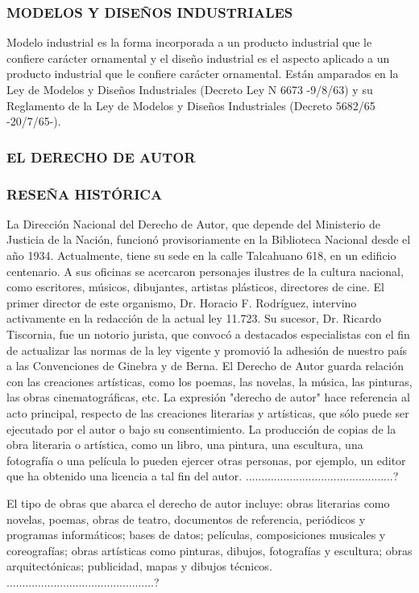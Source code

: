\subsubsection*{MODELOS Y DISEÑOS INDUSTRIALES}
Modelo industrial es la forma incorporada a un producto industrial que le confiere carácter ornamental y el diseño industrial es el aspecto aplicado a un producto industrial que le confiere carácter ornamental. Están amparados en la Ley de Modelos y Diseños Industriales (Decreto Ley N 6673 -9/8/63) y su Reglamento de la Ley de Modelos y Diseños Industriales (Decreto 5682/65 -20/7/65-).

\subsubsection*{EL DERECHO DE AUTOR}
\subsubsection*{RESEÑA HISTÓRICA}
La Dirección Nacional del Derecho de Autor, que depende del Ministerio de Justicia de la Nación, funcionó provisoriamente en la Biblioteca Nacional desde el año 1934. Actualmente, tiene su sede en la calle Talcahuano 618, en un edificio centenario. A sus oficinas se acercaron personajes ilustres de la cultura nacional, como escritores, músicos, dibujantes, artistas plásticos, directores de cine. El primer director de este organismo, Dr. Horacio F. Rodríguez, intervino activamente en la redacción de la actual ley 11.723. Su sucesor, Dr. Ricardo Tiscornia, fue un notorio jurista, que convocó a destacados especialistas con el fin de actualizar las normas de la ley vigente y promovió la adhesión de nuestro país a las Convenciones de Ginebra y de Berna. El Derecho de Autor guarda relación con las creaciones artísticas, como los poemas, las novelas, la música, las pinturas, las obras cinematográficas, etc. La expresión "derecho de autor" hace referencia al acto principal, respecto de las creaciones literarias y artísticas, que sólo puede ser ejecutado por el autor o bajo su consentimiento. La producción de copias de la obra literaria o artística, como un libro, una pintura, una escultura, una fotografía o una película lo pueden ejercer otras personas, por ejemplo, un editor que ha obtenido una licencia a tal fin del autor. ...............................................?

El tipo de obras que abarca el derecho de autor incluye: obras literarias como novelas, poemas, obras de teatro, documentos de referencia, periódicos y programas informáticos; bases de datos; películas, composiciones musicales y coreografías; obras artísticas como pinturas, dibujos, fotografías y escultura; obras arquitectónicas; publicidad, mapas y dibujos técnicos. ...............................................?

